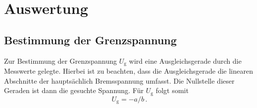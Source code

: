 \section{Auswertung}
\label{sec:Auswertung}



\subsection{Bestimmung der Grenzspannung}
\label{sec:Auswertunga}

Zur Bestimmung der Grenzspannung $U_{\text{g}}$ wird eine Ausgleichsgerade durch die Messwerte gelegte. Hierbei ist zu beachten, dass die Ausgleichsgerade die linearen Abschnitte der hauptsächlich Bremsspannung umfasst.
Die Nullstelle dieser Geraden ist dann die gesuchte Spannung. Für $U_{\text{g}}$ folgt somit
\begin{equation}
    U_{\text{g}}=-a/b\, .
    \label{eqn:U_g}
\end{equation}

